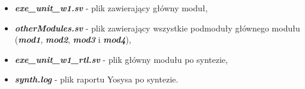 \begin{itemize}
	\item \textbf{\emph{exe\_unit\_w1.sv}} - plik zawierający główny moduł,
	\item \textbf{\emph{otherModules.sv}} - plik zawierający wszystkie podmoduły głównego modułu (\textbf{\emph{mod1}}, \textbf{\emph{mod2}}, \textbf{\emph{mod3}} i \textbf{\emph{mod4}}),
	\item \textbf{\emph{exe\_unit\_w1\_rtl.sv}} - plik główny modułu po syntezie,
	\item \textbf{\emph{synth.log}} - plik raportu Yosysa po syntezie.
\end{itemize}